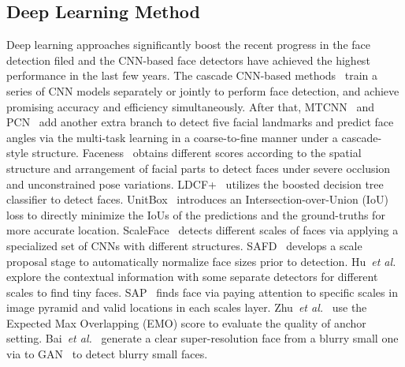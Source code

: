 \documentclass{article} \usepackage{nips13submit_e,times}
\def\etal{{\em et al.}}
\begin{document}
\subsection{Deep Learning Method}
Deep learning approaches significantly boost the recent progress in the face detection filed and the CNN-based face detectors have achieved the highest performance in the last few years. The cascade CNN-based methods~\cite{DBLP:conf/cvpr/LiLSBH15,DBLP:conf/cvpr/QinYLH16} train a series of CNN models separately or jointly to perform face detection, and achieve promising accuracy and efficiency simultaneously. After that, MTCNN~\cite{DBLP:journals/spl/ZhangZLQ16} and PCN~\cite{shi2018real} add another extra branch to detect five facial landmarks and predict face angles via the multi-task learning in a coarse-to-fine manner under a cascade-style structure. Faceness~\cite{DBLP:conf/iccv/YangLLT15} obtains different scores according to the spatial structure and arrangement of facial parts to detect faces under severe occlusion and unconstrained pose variations. LDCF+~\cite{DBLP:conf/icpr/Ohn-BarT16a} utilizes the boosted decision tree classifier to detect faces. UnitBox~\cite{DBLP:conf/mm/YuJWCH16} introduces an Intersection-over-Union (IoU) loss to directly minimize the IoUs of the predictions and the ground-truths for more accurate location. ScaleFace~\cite{DBLP:journals/corr/YangXLT17} detects different scales of faces via applying a specialized set of CNNs with different structures. SAFD~\cite{hao2017scale} develops a scale proposal stage to automatically normalize face sizes prior to detection. Hu~\etal~\cite{DBLP:conf/cvpr/HuR17} explore the contextual information with some separate detectors for different scales to find tiny faces. SAP~\cite{song2018beyond} finds face via paying attention to specific scales in image pyramid and valid locations in each scales layer. Zhu~\etal~\cite{zhu2018seeing} use the Expected Max Overlapping (EMO) score to evaluate the quality of anchor setting. Bai~\etal~\cite{bai2018finding} generate a clear super-resolution face from a blurry small one via to GAN~\cite{goodfellow2014generative} to detect blurry small faces.
\end{document}
